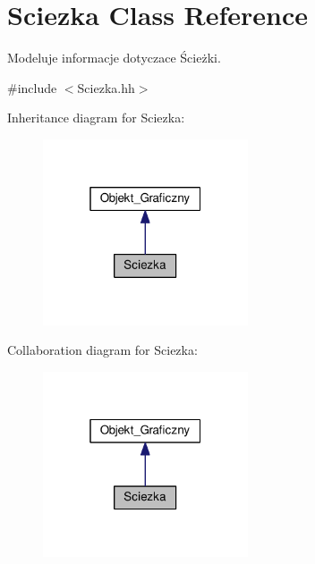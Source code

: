 \hypertarget{class_sciezka}{\section{Sciezka Class Reference}
\label{class_sciezka}
}


Modeluje informacje dotyczace Ścieżki.  




{\ttfamily \#include $<$Sciezka.\+hh$>$}



Inheritance diagram for Sciezka\+:\nopagebreak
\begin{figure}[H]
\begin{center}
\leavevmode
\includegraphics[width=172pt]{class_sciezka__inherit__graph}
\end{center}
\end{figure}


Collaboration diagram for Sciezka\+:\nopagebreak
\begin{figure}[H]
\begin{center}
\leavevmode
\includegraphics[width=172pt]{class_sciezka__coll__graph}
\end{center}
\end{figure}
